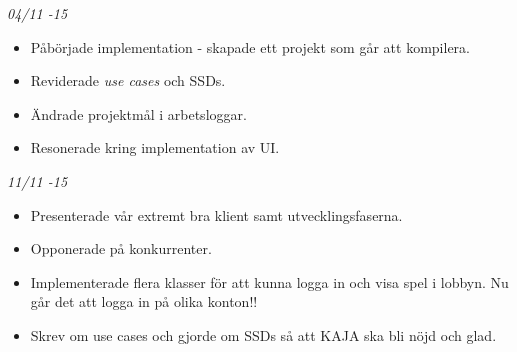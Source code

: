 \documentclass{article}
\begin{document}
    {\large \textit{04/11 -15}}
    \begin{itemize}
        \item Påbörjade implementation - skapade ett projekt som går att
              kompilera.
        \item Reviderade \textit{use cases} och SSDs.
        \item Ändrade projektmål i arbetsloggar.
        \item Resonerade kring implementation av UI.
    \end{itemize}

    {\large \textit{11/11 -15}}
    \begin{itemize}
        \item Presenterade vår extremt bra klient samt utvecklingsfaserna.
        \item Opponerade på konkurrenter.
        \item Implementerade flera klasser för att kunna logga in och visa spel
              i lobbyn. Nu går det att logga in på olika konton!!
        \item Skrev om use cases och gjorde om SSDs så att KAJA ska bli nöjd och
              glad.
    \end{itemize}
\end{document}
